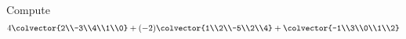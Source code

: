 Compute
%
\begin{equation*}
    4\colvector{2\\-3\\4\\1\\0}+
(-2)\colvector{1\\2\\-5\\2\\4}+
      \colvector{-1\\3\\0\\1\\2}
\end{equation*}
%